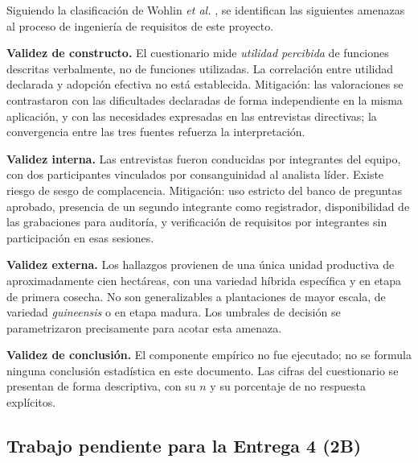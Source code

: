 Siguiendo la clasificación de Wohlin \emph{et al.} \cite{wohlin2012}, se identifican las siguientes
amenazas al proceso de ingeniería de requisitos de este proyecto.

\textbf{Validez de constructo.} El cuestionario mide \emph{utilidad percibida} de funciones descritas
verbalmente, no de funciones utilizadas. La correlación entre utilidad declarada y adopción efectiva
no está establecida. Mitigación: las valoraciones se contrastaron con las dificultades declaradas de
forma independiente en la misma aplicación, y con las necesidades expresadas en las entrevistas
directivas; la convergencia entre las tres fuentes refuerza la interpretación.

\textbf{Validez interna.} Las entrevistas fueron conducidas por integrantes del equipo, con dos
participantes vinculados por consanguinidad al analista líder. Existe riesgo de sesgo de
complacencia. Mitigación: uso estricto del banco de preguntas aprobado, presencia de un segundo
integrante como registrador, disponibilidad de las grabaciones para auditoría, y verificación de
requisitos por integrantes sin participación en esas sesiones.

\textbf{Validez externa.} Los hallazgos provienen de una única unidad productiva de aproximadamente
cien hectáreas, con una variedad híbrida específica y en etapa de primera cosecha. No son
generalizables a plantaciones de mayor escala, de variedad \emph{guineensis} o en etapa madura. Los
umbrales de decisión se parametrizaron precisamente para acotar esta amenaza.

\textbf{Validez de conclusión.} El componente empírico no fue ejecutado; no se formula ninguna
conclusión estadística en este documento. Las cifras del cuestionario se presentan de forma
descriptiva, con su $n$ y su porcentaje de no respuesta explícitos.

\subsection{Trabajo pendiente para la Entrega 4 (2B)}


